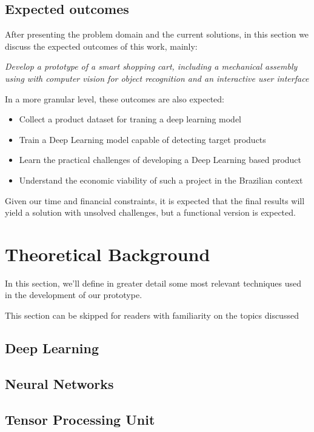 \documentclass[openright]{normas-utf-tex} %
\begin{document}
\section{Expected outcomes}

After presenting the problem domain and the current solutions, in this section we discuss the expected
outcomes of this work, mainly:

\textit{Develop a prototype of a smart shopping cart, including a mechanical assembly using with computer vision for object recognition
and an interactive user interface}

In a more granular level, these outcomes are also expected:

\begin{itemize}
    \item Collect a product dataset for traning a deep learning model
    \item Train a Deep Learning model capable of detecting target products
	\item Learn the practical challenges of developing a Deep Learning based product
    \item Understand the economic viability of such a project in the Brazilian context
\end{itemize}

Given our time and financial constraints, it is expected that the final results will yield
a solution with unsolved challenges, but a functional version is expected.

\chapter{Theoretical Background}

In this section, we'll define in greater detail some most relevant techniques
used in the development of our prototype.

This section can be skipped for readers with familiarity on the topics discussed

\section{Deep Learning}

\section{Neural Networks}

\section{Tensor Processing Unit}
\end{document}
